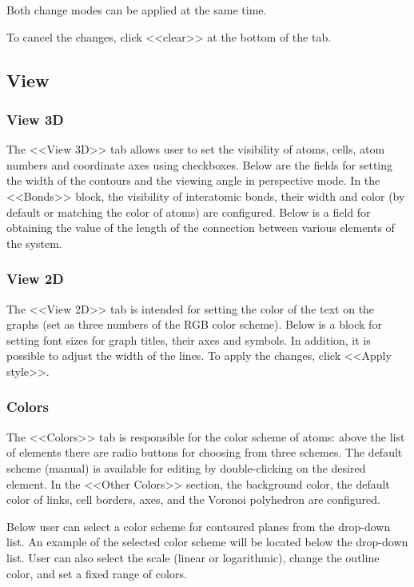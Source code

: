 \documentclass{article}
\begin{document}
Both change modes can be applied at the same time.

To cancel the changes, click <<clear>> at the bottom of the tab.



\subsection{View}

\subsubsection{View 3D}

The <<View 3D>> tab allows user to set the visibility of atoms, cells, atom numbers and coordinate axes using checkboxes. Below are the fields for setting the width of the contours and the viewing angle in perspective mode. In the <<Bonds>> block, the visibility of interatomic bonds, their width and color (by default or matching the color of atoms) are configured. Below is a field for obtaining the value of the length of the connection between various elements of the system.

\subsubsection{View 2D}

The <<View 2D>> tab is intended for setting the color of the text on the graphs (set as three numbers of the RGB color scheme). Below is a block for setting font sizes for graph titles, their axes and symbols. In addition, it is possible to adjust the width of the lines. To apply the changes, click <<Apply style>>.

\subsubsection{Colors \label{colorsisos}}

The <<Colors>> tab is responsible for the color scheme of atoms: above the list of elements there are radio buttons for choosing from three schemes. The default scheme (manual) is available for editing by double-clicking on the desired element. In the <<Other Colors>> section, the background color, the default color of links, cell borders, axes, and the Voronoi polyhedron are configured.

Below user can select a color scheme for contoured planes from the drop-down list. An example of the selected color scheme will be located below the drop-down list. User can also select the scale (linear or logarithmic), change the outline color, and set a fixed range of colors.
\end{document}
